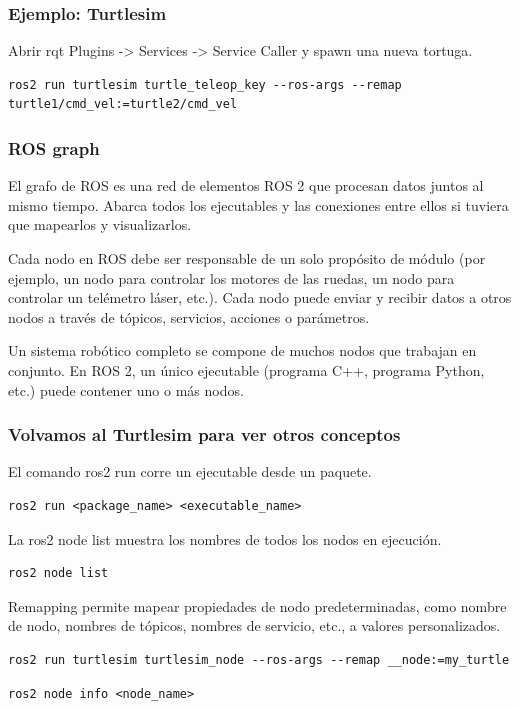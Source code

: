 \begin{frame}[fragile]
	\frametitle{Ejemplo: Turtlesim}
	\footnotesize
	
    Abrir rqt
	Plugins -> Services -> Service Caller y spawn una nueva tortuga.
\begin{lstlisting}[style=bash]    
ros2 run turtlesim turtle_teleop_key --ros-args --remap turtle1/cmd_vel:=turtle2/cmd_vel
\end{lstlisting}

\end{frame}

\begin{frame}
    \frametitle{ROS graph}
    El grafo de ROS es una red de elementos ROS 2 que procesan datos juntos al mismo tiempo. Abarca todos los ejecutables y las conexiones entre ellos si tuviera que mapearlos y visualizarlos.
    
    Cada nodo en ROS debe ser responsable de un solo propósito de módulo (por ejemplo, un nodo para controlar los motores de las ruedas, un nodo para controlar un telémetro láser, etc.). Cada nodo puede enviar y recibir datos a otros nodos a través de tópicos, servicios, acciones o parámetros.
    
    Un sistema robótico completo se compone de muchos nodos que trabajan en conjunto. En ROS 2, un único ejecutable (programa C++, programa Python, etc.) puede contener uno o más nodos.
    
\end{frame}

\begin{frame}[fragile]
    \frametitle{Volvamos al Turtlesim para ver otros conceptos}
    
    El comando ros2 run corre un ejecutable desde un paquete.
\begin{lstlisting}[style=bash]    
ros2 run <package_name> <executable_name>
\end{lstlisting}

    La ros2 node list muestra los nombres de todos los nodos en ejecución.

\begin{lstlisting}[style=bash]    
ros2 node list
\end{lstlisting}

    Remapping permite mapear propiedades de nodo predeterminadas, como nombre de nodo, nombres de tópicos, nombres de servicio, etc., a valores personalizados.
    
\begin{lstlisting}[style=bash]    
ros2 run turtlesim turtlesim_node --ros-args --remap __node:=my_turtle
\end{lstlisting}

\begin{lstlisting}[style=bash]    
ros2 node info <node_name>
\end{lstlisting}
\end{frame}

